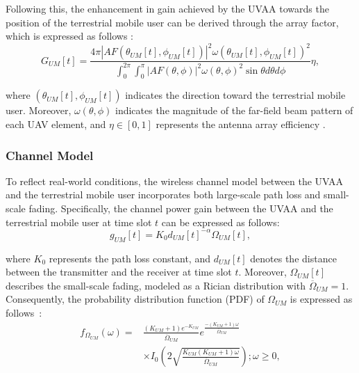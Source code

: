 \documentclass[10pt,journal,compsoc]{IEEEtran}
\begin{document}
\par Following this, the enhancement in gain achieved by the UVAA towards the position of the terrestrial mobile user can be derived through the array factor, which is expressed as follows \cite{sun2022secure}:
\begin{equation}
\label{eq:gain}
    G_{UM}[t] = \frac{4 \pi \left| AF(\theta_{UM}[t], \phi_{UM}[t]) \right|^2 \omega(\theta_{UM}[t], \phi_{UM}[t])^2}{\int_{0}^{2\pi} \int_{0}^{\pi} \left| AF(\theta, \phi) \right|^2 \omega(\theta, \phi)^2 \sin \theta d \theta d \phi} \eta,
\end{equation}

\noindent where $(\theta_{UM}[t], \phi_{UM}[t])$ indicates the direction toward the terrestrial mobile user. Moreover, $\omega(\theta, \phi)$ indicates the magnitude of the far-field beam pattern of each UAV element, and $\eta \in [0, 1]$ represents the antenna array efficiency \cite{Mozaffari2019communicationsandcontrol}.

\subsubsection{Channel Model}

\par To reflect real-world conditions, the wireless channel model between the UVAA and the terrestrial mobile user incorporates both large-scale path loss and small-scale fading. Specifically, the channel power gain between the UVAA and the terrestrial mobile user at time slot $t$ can be expressed as follows:
\begin{equation}
    g_{UM}[t] = K_0 d_{UM}[t]^{-\alpha} \Omega_{UM}[t],
\end{equation}

\noindent where $K_0$ represents the path loss constant, and $d_{UM}[t]$ denotes the distance between the transmitter and the receiver at time slot $t$. Moreover, $\Omega_{UM}[t]$ describes the small-scale fading, modeled as a Rician distribution with $\overline{\Omega}_{UM} = 1$. Consequently, the probability distribution function (PDF) of $\Omega_{UM}$ is expressed as follows~\cite{azari2017}:
\begin{equation}
\begin{split}
    f_{\Omega_{UM}}(\omega) = & \frac{(K_{UM} + 1) e^{-K_{UM}}}{\overline{\Omega}_{UM}} e^{\frac{-(K_{UM} + 1) \omega}{\overline{\Omega}_{UM}}} \\ & \times I_0 \left(2\sqrt{\frac{K_{UM} (K_{UM} + 1) \omega}{\overline{\Omega}_{UM}}} \right); \omega \geq 0,
\end{split}
\end{equation}
\end{document}
